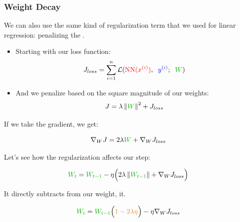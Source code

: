             \subsubsection{Weight Decay}

                We can also use the same kind of regularization term that we used for linear regression: penalizing the .

                \begin{itemize}
                    \item Starting with our loss function:
                        \begin{equation}
                            J_{loss} = \sum_{i = 1}^{n}
                                \mathcal{L}( \red{\text{NN}(x^{(i)})},\;\; \blu{y^{(i)}};\;\; \grn{W})
                        \end{equation}
                    \item And we penalize based on the square magnitude of our weights:
                        \begin{equation}
                            J = \lambda \norm{\grn{W}}^2 +
                                J_{loss}
                        \end{equation}
                \end{itemize}

            If we take the gradient, we get:

            \begin{equation}
                \nabla_W J = 2\lambda \grn{W} + 
                    \nabla_W J_{loss}
            \end{equation}

            Let's see how the regularization affects our step:

            \begin{equation}
                \grn{W_t} = 
                \grn{W_{t-1}} - 
                \eta \Big( 2\lambda \norm{\grn{W_{t-1}}} + 
                     \nabla_W J_{loss} \Big)
            \end{equation}

            It directly subtracts from our weight,  it.

            \begin{equation}
                \grn{W_t} = 
                \grn{W_{t-1}} \Big( \org{ 1 -  2\lambda \eta } \Big)  - 
                     \eta \nabla_W J_{loss} 
            \end{equation}

